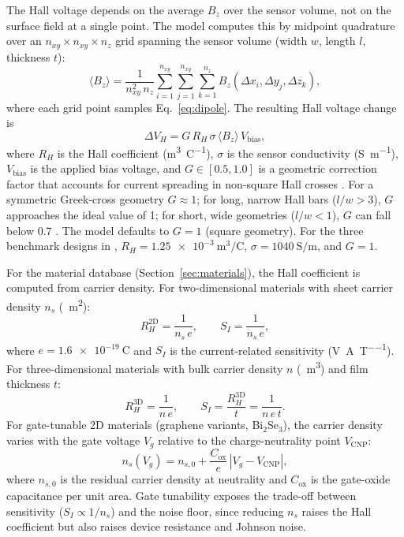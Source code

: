 \documentclass[pdflatex,sn-basic]{sn-jnl}
\theoremstyle{thmstyleone}
\theoremstyle{thmstyletwo}
\theoremstyle{thmstylethree}
\begin{document}
The Hall voltage depends on the average $B_z$ over the sensor volume, not on the surface field at a single point. The model computes this by midpoint quadrature over an $n_{xy} \times n_{xy} \times n_z$ grid spanning the sensor volume (width $w$, length $l$, thickness $t$):
\begin{equation}
\langle B_z \rangle = \frac{1}{n_{xy}^2\, n_z} \sum_{i=1}^{n_{xy}} \sum_{j=1}^{n_{xy}} \sum_{k=1}^{n_z} B_z(\Delta x_i, \Delta y_j, \Delta z_k),
\label{eq:avgbz}
\end{equation}
where each grid point samples Eq.~\eqref{eq:dipole}. The resulting Hall voltage change is
\begin{equation}
\Delta V_H = G \, R_H \, \sigma \, \langle B_z \rangle \, V_{\text{bias}},
\label{eq:vh}
\end{equation}
where $R_H$ is the Hall coefficient (\si{\meter\cubed\per\coulomb}), $\sigma$ is the sensor conductivity (\si{\siemens\per\meter}), $V_{\text{bias}}$ is the applied bias voltage, and $G \in [0.5, 1.0]$ is a geometric correction factor that accounts for current spreading in non-square Hall crosses \citep{popovic2004}. For a symmetric Greek-cross geometry $G \approx 1$; for long, narrow Hall bars ($l/w > 3$), $G$ approaches the ideal value of 1; for short, wide geometries ($l/w < 1$), $G$ can fall below 0.7 \citep{popovic2004}. The model defaults to $G = 1$ (square geometry). For the three benchmark designs in \citet{govindaraju2025}, $R_H = \SI{1.25e-3}{\meter\cubed\per\coulomb}$, $\sigma = \SI{1040}{\siemens\per\meter}$, and $G = 1$.

For the material database (Section~\ref{sec:materials}), the Hall coefficient is computed from carrier density. For two-dimensional materials with sheet carrier density $n_s$ (\si{\per\meter\squared}):
\begin{equation}
R_H^{\text{2D}} = \frac{1}{n_s\, e}, \qquad S_I = \frac{1}{n_s\, e},
\label{eq:rh2d}
\end{equation}
where $e = \SI{1.6e-19}{\coulomb}$ and $S_I$ is the current-related sensitivity (\si{\volt\per\ampere\per\tesla}). For three-dimensional materials with bulk carrier density $n$ (\si{\per\meter\cubed}) and film thickness $t$:
\begin{equation}
R_H^{\text{3D}} = \frac{1}{n\, e}, \qquad S_I = \frac{R_H^{\text{3D}}}{t} = \frac{1}{n\, e\, t}.
\label{eq:rh3d}
\end{equation}
For gate-tunable 2D materials (graphene variants, Bi$_2$Se$_3$), the carrier density varies with the gate voltage $V_g$ relative to the charge-neutrality point $V_{\text{CNP}}$:
\begin{equation}
n_s(V_g) = n_{s,0} + \frac{C_{\text{ox}}}{e}\,|V_g - V_{\text{CNP}}|,
\label{eq:gate}
\end{equation}
where $n_{s,0}$ is the residual carrier density at neutrality and $C_{\text{ox}}$ is the gate-oxide capacitance per unit area. Gate tunability exposes the trade-off between sensitivity ($S_I \propto 1/n_s$) and the noise floor, since reducing $n_s$ raises the Hall coefficient but also raises device resistance and Johnson noise.
\end{document}
